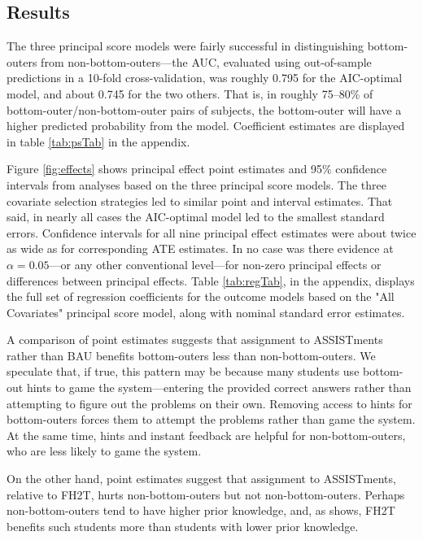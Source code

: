 \documentclass[]{article}
\begin{document}

\subsection{Results}

The three principal score models were fairly successful in distinguishing bottom-outers from non-bottom-outers---the AUC, evaluated using out-of-sample predictions in a 10-fold cross-validation, was roughly 0.795 for the AIC-optimal model, and about 0.745 for the two others. That is, in roughly 75--80\% of bottom-outer/non-bottom-outer pairs of subjects, the bottom-outer will have a higher predicted probability from the model.
Coefficient estimates are displayed in table \ref{tab:psTab} in the appendix.

Figure \ref{fig:effects} shows principal effect point estimates and 95\% confidence intervals from analyses based on the three principal score models.
The three covariate selection strategies led to similar point and interval estimates.
That said, in nearly all cases the AIC-optimal model led to the smallest standard errors.
Confidence intervals for all nine principal effect estimates were about twice as wide as for corresponding ATE estimates.
In no case was there evidence at $\alpha=0.05$---or any other conventional level---for non-zero principal effects or differences between principal effects.
Table \ref{tab:regTab}, in the appendix, displays the full set of regression coefficients for the outcome models based on the "All Covariates" principal score model, along with nominal standard error estimates.

A comparison of point estimates suggests that assignment to ASSISTments rather than BAU benefits bottom-outers less than non-bottom-outers.
We speculate that, if true, this pattern may be because many students use bottom-out hints to game the system---entering the provided correct answers rather than attempting to figure out the problems on their own.
Removing access to hints for bottom-outers forces them to attempt the problems rather than game the system.
At the same time, hints and instant feedback are helpful for non-bottom-outers, who are less likely to game the system.

On the other hand, point estimates suggest that assignment to ASSISTments, relative to FH2T, hurts non-bottom-outers but not non-bottom-outers.
Perhaps non-bottom-outers tend to have higher prior knowledge, and, as \cite{impactPaper} shows, FH2T benefits such students more than students with lower prior knowledge.
\end{document}
